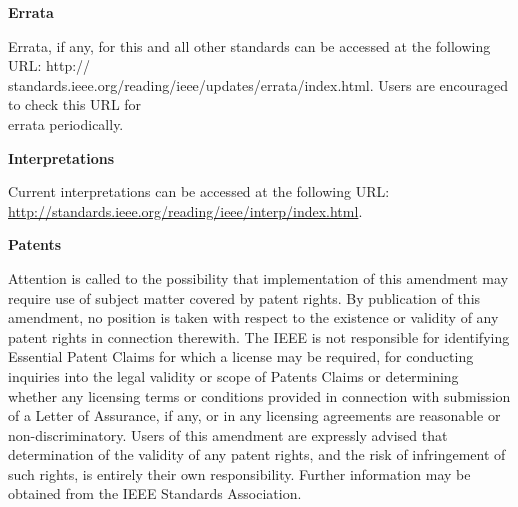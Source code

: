 {\fmserif
{\fmsans\bfseries\fontsize{11}{13}\selectfont Errata\par}
\vspace{13pt}
Errata, if any, for this and all other standards can be accessed at the following URL: http://\\
standards.ieee.org/reading/ieee/updates/errata/index.html. Users are encouraged to check this URL for\\
errata periodically.\par
\vspace{18pt}
{\fmsans\bfseries\fontsize{11}{13}\selectfont Interpretations\par}
\vspace{13pt}
Current interpretations can be accessed at the following URL: \url{http://standards.ieee.org/reading/ieee/interp/index.html}.\par
\vspace{18pt}
{\fmsans\bfseries\fontsize{11}{13}\selectfont Patents\par}
\vspace{13pt}
Attention is called to the possibility that implementation of this amendment may require use of subject matter covered by patent rights. By publication of this amendment, no position is taken with respect to the existence or validity of any patent rights in connection therewith. The IEEE is not responsible for identifying Essential Patent Claims for which a license may be required, for conducting inquiries into the legal validity or scope of Patents Claims or determining whether any licensing terms or conditions provided in connection with submission of a Letter of Assurance, if any, or in any licensing agreements are reasonable or non-discriminatory. Users of this amendment are expressly advised that determination of the validity of any patent rights, and the risk of infringement of such rights, is entirely their own responsibility. Further information may be obtained from the IEEE Standards Association.\par
}
\newpage

